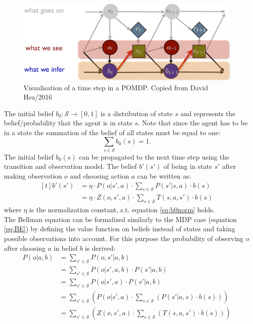 \begin{figure}
    \centering
    \includegraphics[width=\textwidth]{Report/images/POMDP.png}
    \caption{Visualisation of a time step in a POMDP. Copied from David Hsu/2016 \cite{POMDPpresi}}
    \label{fig:POMDP}
\end{figure}


The initial belief $b_0:\mathcal{S}\rightarrow [0, 1]$ is a distribution of state $s$ and represents the belief/probability that the agent is in state $s$. Note that since the agent has to be in a state the summation of the belief of all states must be equal to one:
\begin{equation}\label{eq:b0norm}
    \sum_{s\in\mathcal{S}} b_0(s)=1.
\end{equation}
The initial belief $b_0(s)$ can be propagated to the next time step using the transition and observation model. The belief $b'(s')$ of being in state $s'$ after making observation $o$ and choosing action $a$ can be written as:
%
\begin{equation}\label{eq:bdash}
    \begin{aligned}[t]
    b'(s') &= \eta \cdot P(o|s', a)\cdot \sum_{s\in\mathcal{S}}P(s'|s,a)\cdot b(s) \\
    &=\eta \cdot Z(o,s',a)\cdot \sum_{s\in\mathcal{S}}T(s,a,s')\cdot b(s)
    \end{aligned}
\end{equation}
%
where $\eta$ is the normalization constant, s.t. equation \ref{eq:b0norm} holds.\\
The Bellman equation can be formalized similarly to the MDP case (equation \ref{eq:BE}) by defining the value function on beliefs instead of states and taking possible observations into account. For this purpose the probability of observing $o$ after choosing $a$ in belief $b$ is derived:
%
\begin{align}
    P(o|a,b) &= \sum_{s'\in\mathcal{S}}P(o,s'|a,b)\\
    &= \sum_{s'\in\mathcal{S}}P(o|s', a,b)\cdot P(s'|a,b)\\
    &=\label{eq:line2} \sum_{s'\in\mathcal{S}}P(o|s', a)\cdot P(s'|a,b)\\
    &=\label{eq:line3}  \sum_{s'\in\mathcal{S}}\left(P(o|s', a)\cdot \sum_{s\in\mathcal{S}}\left(P(s'|a,s)\cdot b(s)\right)\right)\\
    &= \sum_{s'\in\mathcal{S}}\left(Z(o,s', a)\cdot \sum_{s\in\mathcal{S}}\left(T(s,a,s')\cdot b(s)\right)\right)
\end{align}
